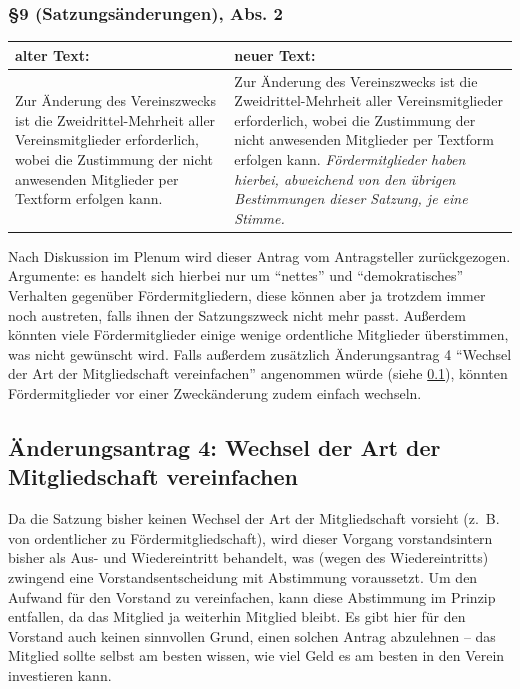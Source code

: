 \documentclass[a4paper,12pt]{scrartcl}
\begin{document}
\subsubsection*{§9 (Satzungsänderungen), Abs. 2}
\begin{longtable}[c]{@{}ll@{}}
\toprule
\begin{minipage}[b]{0.47\columnwidth}\raggedright\strut
alter Text:
\strut\end{minipage} &
\begin{minipage}[b]{0.47\columnwidth}\raggedright\strut
neuer Text:
\strut\end{minipage}\tabularnewline
\midrule
\endhead
\begin{minipage}[t]{0.47\columnwidth}\raggedright\strut
Zur Änderung des Vereinszwecks ist die Zweidrittel-Mehrheit aller
Vereinsmitglieder erforderlich, wobei die Zustimmung der nicht
anwesenden Mitglieder per Textform erfolgen kann.
\strut\end{minipage} &
\begin{minipage}[t]{0.47\columnwidth}\raggedright\strut
Zur Änderung des Vereinszwecks ist die Zweidrittel-Mehrheit aller
Vereinsmitglieder erforderlich, wobei die Zustimmung der nicht
anwesenden Mitglieder per Textform erfolgen kann. \emph{Fördermitglieder haben
hierbei, abweichend von den übrigen Bestimmungen dieser Satzung, je eine
Stimme.}
\strut\end{minipage}\tabularnewline
\bottomrule
\end{longtable}

\withdrawn
Nach Diskussion im Plenum wird dieser Antrag vom Antragsteller
zurückgezogen. Argumente: es handelt sich hierbei nur um "`nettes"' und
"`demokratisches"' Verhalten gegenüber Fördermitgliedern, diese können aber ja
trotzdem immer noch austreten, falls ihnen der Satzungszweck nicht mehr passt.
Außerdem könnten viele Fördermitglieder einige wenige ordentliche Mitglieder
überstimmen, was nicht gewünscht wird. Falls außerdem zusätzlich Änderungsantrag
4 "`Wechsel der Art der Mitgliedschaft vereinfachen"' angenommen würde (siehe
\ref{uxe4nderungsantrag-4-wechsel-der-art-der-mitgliedschaft-vereinfachen}),
könnten Fördermitglieder vor einer Zweckänderung zudem einfach wechseln.


\subsection{Änderungsantrag 4: Wechsel der Art der Mitgliedschaft vereinfachen}
\label{uxe4nderungsantrag-4-wechsel-der-art-der-mitgliedschaft-vereinfachen}
Da die Satzung bisher keinen Wechsel der Art der Mitgliedschaft vorsieht
(z.~B. von ordentlicher zu Fördermitgliedschaft), wird dieser Vorgang
vorstandsintern bisher als Aus- und Wiedereintritt behandelt, was (wegen
des Wiedereintritts) zwingend eine Vorstandsentscheidung mit Abstimmung
voraussetzt. Um den Aufwand für den Vorstand zu vereinfachen, kann diese
Abstimmung im Prinzip entfallen, da das Mitglied ja weiterhin Mitglied
bleibt. Es gibt hier für den Vorstand auch keinen sinnvollen Grund,
einen solchen Antrag abzulehnen -- das Mitglied sollte selbst am besten
wissen, wie viel Geld es am besten in den Verein investieren kann.
\end{document}

